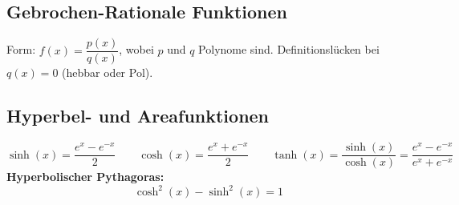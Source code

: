 \documentclass[../zusammenfassung_AN.tex]{subfiles}
\begin{document}
	\subsection{Gebrochen-Rationale Funktionen}
	
	\begin{tcolorbox}[hinweis]
		Form: $f(x) = \dfrac{p(x)}{q(x)}$, wobei $p$ und $q$ Polynome sind.
		Definitionslücken bei $q(x)=0$ (hebbar oder Pol).
	\end{tcolorbox}
	
	\subsection{Hyperbel- und Areafunktionen}
	
	\begin{tcolorbox}[dglbox, title={Hyperbolische Funktionen}]
		\[
		\sinh(x) = \frac{e^x - e^{-x}}{2} \qquad
		\cosh(x) = \frac{e^x + e^{-x}}{2} \qquad
		\tanh(x) = \frac{\sinh(x)}{\cosh(x)} = \frac{e^x - e^{-x}}{e^x + e^{-x}}
		\]
		\textbf{Hyperbolischer Pythagoras:}
		\[
		\cosh^2(x) - \sinh^2(x) = 1
		\]
	\end{tcolorbox}
	
\end{document}
